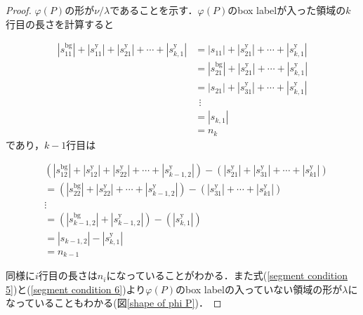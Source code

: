 \begin{proof}
  $\varphi(P)$の形が$\nu/\lambda$であることを示す．$\varphi(P)$のbox labelが入った領域の$k$行目の長さを計算すると

  \begin{align*}
    |s_{11}^{\text{bg}}| + |s_{11}^{\text{y}}| + |s_{21}^{\text{y}}| + \cdots + |s_{k,1}^{\text{y}}|
    &=|s_{11}| + |s_{21}^{\text{y}}| + \cdots + |s_{k,1}^{\text{y}}|\\
    &=|s_{21}^{\text{bg}}| + |s_{21}^{\text{y}}| + \cdots + |s_{k,1}^{\text{y}}|\\
    &=|s_{21}| + |s_{31}^{\text{y}}| + \cdots + |s_{k,1}^{\text{y}}|\\
    &\:\:\vdots\\
    &=|s_{k,1}|\\
    &=n_k
  \end{align*}
  であり，$k-1$行目は

  \begin{align*}
    &(|s_{12}^{\text{bg}}| + |s_{12}^{\text{y}}| + |s_{22}^{\text{y}}| + \cdots + |s_{k-1,2}^{\text{y}}|)
    - (|s_{21}^{\text{y}}|+|s_{31}^{\text{y}}|+\cdots+|s_{k1}^{\text{y}}|)\\
    &=(|s_{22}^{\text{bg}}| + |s_{22}^{\text{y}}| + \cdots + |s_{k-1,2}^{\text{y}}|) - (|s_{31}^{\text{y}}|+\cdots+|s_{k1}^{\text{y}}|)\\
    &\vdots\\
    &=(|s_{k-1,2}^{\text{bg}}|+|s_{k-1,2}^{\text{y}}|)-(|s_{k,1}^{\text{y}}|)\\
    &=|s_{k-1,2}| - |s_{k,1}^{\text{y}}|\\
    &=n_{k-1}
  \end{align*}

  同様に$i$行目の長さは$n_{i}$になっていることがわかる．また式(\ref{segment condition 5})と(\ref{segment condition 6})より$\varphi(P)$のbox labelの入っていない領域の形が$\lambda$になっていることもわかる(図\ref{shape of phi P})．
  


\end{proof}
